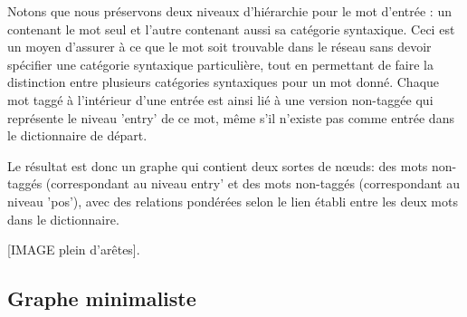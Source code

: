 Notons que nous préservons deux niveaux d'hiérarchie pour le mot d'entrée : un 
contenant le mot seul et l'autre contenant aussi sa catégorie syntaxique. Ceci 
est un moyen d'assurer à ce que le mot soit trouvable dans le réseau sans devoir 
spécifier une catégorie syntaxique particulière, tout en permettant de faire la 
distinction entre plusieurs catégories syntaxiques pour un mot donné. Chaque mot 
taggé à l'intérieur d'une entrée est ainsi lié à une version non-taggée qui 
représente le niveau 'entry' de ce mot, même s'il n'existe pas comme entrée dans 
le dictionnaire de départ.

Le résultat est donc un graphe qui contient deux sortes de nœuds: des mots non-taggés 
(correspondant au niveau entry' et des mots non-taggés (correspondant au niveau 
'pos'), avec des relations pondérées selon le lien établi entre les deux mots dans le dictionnaire.

[IMAGE plein d'arêtes].

\subsection{Graphe minimaliste}


